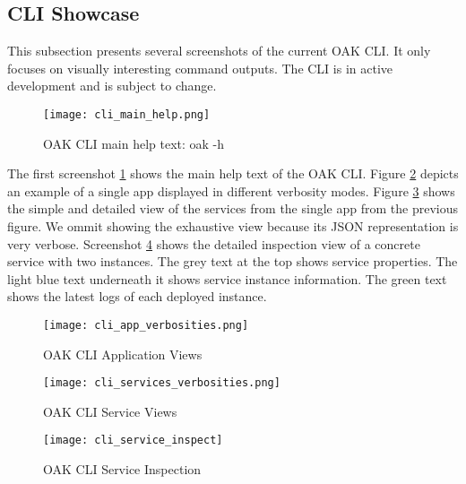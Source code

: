 \subsection{CLI Showcase}

This subsection presents several screenshots of the current OAK CLI.
It only focuses on visually interesting command outputs. 
The CLI is in active development and is subject to change.

\begin{figure}[h]
    \begin{adjustwidth}{-0.1\paperwidth}{-0.1\paperwidth}
        \centering
        \texttt{[image: cli\_main\_help.png]}
        \caption{OAK CLI main help text: oak -h}
        \label{fig:cli_main_help}
    \end{adjustwidth}
\end{figure}
The first screenshot \ref{fig:cli_main_help} shows the main help text of the OAK CLI.
Figure \ref{fig:cli_app_views} depicts an example of a single app displayed in different verbosity modes.
Figure \ref{fig:cli_service_views} shows the simple and detailed view of the services from the single app from the previous figure.
We ommit showing the exhaustive view because its JSON representation is very verbose.
Screenshot \ref{fig:cli_service_inspection} shows the detailed inspection view of a concrete service with two instances.
The grey text at the top shows service properties.
The light blue text underneath it shows service instance information.
The green text shows the latest logs of each deployed instance.

\begin{figure}[h]
    \begin{adjustwidth}{-0.2\paperwidth}{-0.2\paperwidth}
        \centering
        \texttt{[image: cli\_app\_verbosities.png]}
        \caption{OAK CLI Application Views}
        \label{fig:cli_app_views}
    \end{adjustwidth}
\end{figure}

\begin{figure}[p]
    \centering
    \texttt{[image: cli\_services\_verbosities.png]}
    \caption{OAK CLI Service Views}
    \label{fig:cli_service_views}
\end{figure}

\begin{figure}[p]
    \begin{adjustwidth}{-0.1\paperwidth}{-0.1\paperwidth}
        \centering
        \texttt{[image: cli\_service\_inspect]}
        \caption{OAK CLI Service Inspection}
        \label{fig:cli_service_inspection}
    \end{adjustwidth}
\end{figure}
